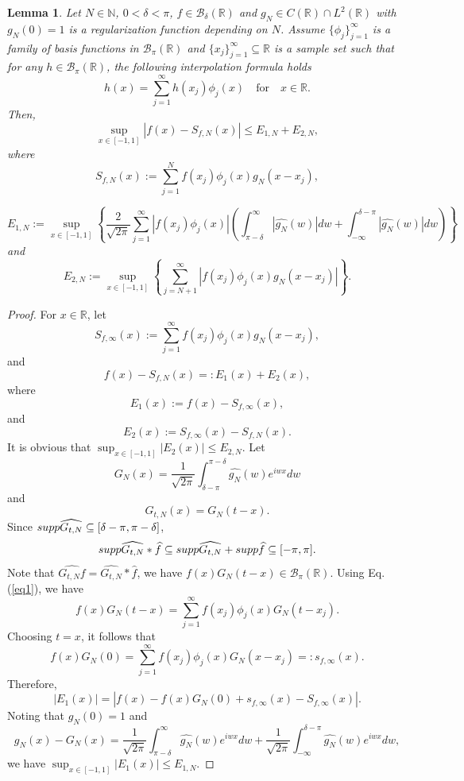 \documentclass[10pt,a4paper]{amsart}
\newtheorem{lemma}{Lemma}
\begin{document}
\begin{lemma}\label{L11}
Let $ N\in \mathbb{N}$, $0<\delta<\pi$, $f\in \mathcal{B}_{\delta}(\mathbb{R})$ and $g_{N}\in C(\mathbb{R})\cap L^{2}(\mathbb{R})$ with $g_{N}(0)=1$ is a regularization function depending on $N$.
Assume $\{\phi_{j}\}_{j=1}^{\infty}$ is a family of basis functions in $\mathcal{B}_{\pi}(\mathbb{R})$ and $\{x_{j}\}_{j=1}^{\infty}\subseteq\mathbb{R}$ is a sample set such that for any $h\in \mathcal{B}_{\pi}(\mathbb{R})$,  the following  interpolation formula holds \begin{equation}\label{eq1}h(x)=\sum_{j=1}^{\infty}h(x_{j})\phi_{j}(x)  \quad\text{for}\quad x\in\mathbb{R}.\end{equation}  
Then, 
$$\sup_{x\in [-1,1]}|f(x) - S_{f,N}(x)|\le E_{1,N}+E_{2,N},$$
where \begin{equation}\label{eqsfn}S_{f,N}(x):=\sum_{j=1}^{N}f(x_{j})\phi_{j}(x)g_{N}(x-x_{j}),\end{equation}

$$E_{1,N}:=\sup_{x\in [-1,1]}\left\{ \frac{2}{\sqrt{2\pi}}\sum_{j=1}^{\infty}|f(x_j)\phi_{j}(x)|\left(\int_{\pi-\delta}^{\infty}|\widehat{g_{N}}(w)|dw+ \int_{-\infty}^{\delta-\pi}|\widehat{g_{N}}(w)|dw\right)\right\}$$ and $$E_{2,N}:=\sup_{x\in [-1,1]}\left\{ \sum_{j=N+1}^{\infty}|f(x_j)\phi_{j}(x)g_{N}(x-x_{j})| \right\}.$$
\end{lemma}

\begin{proof}
For $x\in \mathbb{R}$, let  $$S_{f,\infty}(x):=\sum_{j=1}^{\infty}f(x_{j})\phi_{j}(x)g_{N}(x-x_{j}),$$
and 
$$f(x) - S_{f,N}(x)=:E_{1}(x)+E_{2}(x),$$
where $$E_{1}(x):= f(x)-S_{f,\infty}(x),$$ and $$E_{2}(x):= S_{f,\infty}(x)-S_{f,N}(x).$$
It is obvious that
$\sup_{x\in[-1,1]}|E_{2}(x)|\le E_{2,N}$.
Let $$G_{N}(x)=\frac{1}{\sqrt{2\pi}}\int_{\delta-\pi}^{\pi-\delta}\widehat{g_N}(w)e^{iwx}dw$$ and $$G_{t,N}(x)=G_{N}(t-x).$$ Since ${\rm supp} \widehat{G_{t,N}} \subseteq [\delta-\pi,\pi-\delta] $, $${\rm supp}\widehat{G_{t,N}}*\widehat{f} \subseteq {\rm supp}\widehat{G_{t,N}}+ {\rm supp}\widehat{f} \subseteq[-\pi,\pi].$$ Note that $\widehat{G_{t,N}f}=\widehat{G_{t,N}}*\widehat{f} $,  we have $f(x)G_{N}(t-x)\in  \mathcal{B}_{\pi}(\mathbb{R})$. Using Eq.(\ref{eq1}), we have 
$$f(x)G_{N}(t-x)=\sum_{j=1}^{\infty}f(x_{j})\phi_{j}(x)G_{N}(t-x_{j}).$$
Choosing $t=x$, it follows that
$$f(x)G_{N}(0)=\sum_{j=1}^{\infty}f(x_{j})\phi_{j}(x)G_{N}(x-x_{j})=:s_{f,\infty}(x).$$ Therefore,
$$|E_{1}(x)|=|f(x)-f(x)G_{N}(0)+s_{f,\infty}(x)-S_{f,\infty}(x)|.$$
Noting that $g_{N}(0)=1$ and 
$$g_{N}(x)-G_{N}(x)=\frac{1}{\sqrt{2\pi}}\int_{\pi-\delta}^{\infty}\widehat{g_{N}}(w)e^{iwx}dw+\frac{1}{\sqrt{2\pi}}\int_{-\infty}^{\delta-\pi}\widehat{g_{N}}(w)e^{iwx}dw,$$
we have $\sup_{x\in[-1,1]}|E_{1}(x)|\le E_{1,N}$. 


\end{proof}
\end{document}
